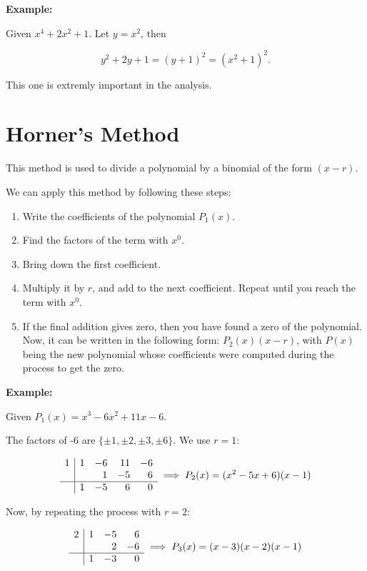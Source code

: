 \textbf{Example:}

Given \(x^4 + 2x^2 + 1\). Let \(y = x^2\), then

\[
    y^2 + 2y + 1 = (y + 1)^2  = (x^2 + 1)^2.
\]

This one is extremly important in the analysis.

\section{Horner’s Method}

This method is used to divide a polynomial by a binomial of the form \((x - r)\).

We can apply this method by following these steps:

\begin{enumerate}

    \item Write the coefficients of the polynomial \(P_1(x)\).
    \item Find the factors of the term with \(x^0\).
    \item Bring down the first coefficient.
    \item Multiply it by \(r\), and add to the next coefficient. Repeat until you reach the term with \(x^0\).
    \item If the final addition gives zero, then you have found a zero of the polynomial. Now, it can be written in the following form: \(P_2(x)(x - r)\), with \(P(x)\) being the new polynomial whose coefficients were computed during the process to get the zero.

\end{enumerate}

\textbf{Example:}

Given \(P_1(x) = x^3 - 6x^2 + 11x - 6\).

The factors of -6 are \(\{\pm 1, \pm 2, \pm 3, \pm 6\}\). We use \(r = 1\):

\[
  \begin{array}{r|rrrr}
  1 & 1 & -6 & 11 & -6 \\
    &   & 1 & -5 & 6 \\
  \hline
    & 1 & -5 & 6 & 0 \\
  \end{array}
  \implies P_2(x) = (x^2 - 5x + 6)(x - 1)
\]

Now, by repeating the process with \(r = 2\):

\[
  \begin{array}{r|rrr}
  2 & 1 & -5 & 6 \\
    &   &  2 & -6 \\
  \hline
    & 1 & -3 & 0 \\
  \end{array}
  \implies P_3(x) = (x - 3)(x - 2)(x - 1)
\]


